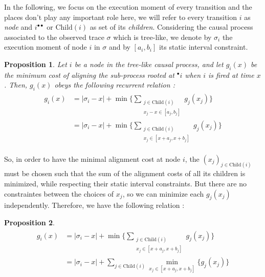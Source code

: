 \documentclass[conference]{IEEEtran}
\newtheorem{proposition}{Proposition}
\begin{document}
In the following, we focus on the execution moment of every transition and the places don't play any important role here, we will refer to every transition $i$ as \textit{node} and $i^{\bullet\bullet}$ or $\text{Child}(i)$ as set of its \textit{children}.
Considering the causal process associated to the observed trace $\sigma$ which is tree-like, we denote by $\sigma_i$ the execution moment of node $i$ in $\sigma$ and by $[a_i, b_i]$ its static interval constraint.
\begin{proposition}
	Let $i$ be a node in the tree-like causal process, and let $g_i(x)$ be the minimum cost of aligning the sub-process rooted at ${}^\bullet i$ when $i$ is fired at time $x$. Then, $g_i(x)$ obeys the following recurrent relation :
    \begin{align*}
        \begin{split}
            g_{i}(x) & = |\sigma_{i}-x| + \min\Biggl\{\sum_{\substack{j \in \text{Child}(i) \\ x_{j}-x\in[a_{j},b_{j}]}}g_{j}(x_{j})\Biggr\} \\
            & = |\sigma_{i}-x| + \min\Biggl\{\sum_{\substack{j \in \text{Child}(i) \\ x_{j}\in[x+a_{j},x+b_{j}]}}g_{j}(x_{j})\Biggr\}
        \end{split}
    \end{align*}
\end{proposition}
So, in order to have the minimal alignment cost at node $i$, the $(x_j)_{j \in \text{Child}(i)}$ must be chosen such that the sum of the alignment costs of all its children is minimized, while respecting their static interval constraints. But there are no constraintes between the choices of $x_j$, so we can minimize each $g_j(x_j)$ independently. Therefore, we have the following relation :
\begin{proposition}
    \begin{align*}
        \begin{split}
            g_{i}(x) & = |\sigma_{i}-x| + \min\Biggl\{\sum_{\substack{j \in \text{Child}(i) \\ x_{j}\in[x+a_{j},x+b_{j}]}}g_{j}(x_{j})\Biggr\} \\
            & = |\sigma_{i}-x| + \sum_{j \in \text{Child}(i)}\min_{x_{j}\in[x+a_{j},x+b_{j}]}\{g_{j}(x_{j})\}\\
        \end{split}
    \end{align*}
\end{proposition}
\end{document}
